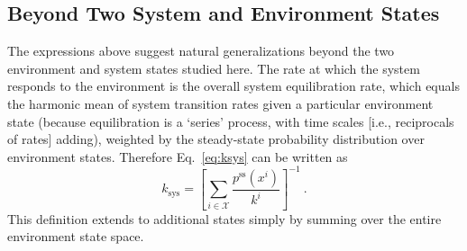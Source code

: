 \documentclass[entropy,article,
submit,
moreauthors,pdftex,10pt,a4paper]{mdpi}
\newcommand{\ksys}{k_\mathrm{sys}}
\begin{document}
\subsection{Beyond Two System and Environment States}
The expressions above suggest natural generalizations beyond the two environment and system states studied here. 
The rate at which the system responds to the environment is the overall system equilibration rate, which equals the 
harmonic mean 
of system transition rates given a particular environment state (because equilibration is a `series' process, with time scales [i.e., reciprocals of rates] adding),
weighted by the 
steady-state probability distribution over environment states. 
Therefore Eq.~\eqref{eq:ksys} can be written as 
\begin{equation}
	\label{eq:ksys_general}
	\ksys=\left[\sum_{i \in \mathcal{X}}\frac{p^\mathrm{ss}(x^i)}{k^{i}}\right]^{-1} \ .
\end{equation}
This definition extends to additional states simply by summing over the entire environment state space. 
\end{document}
